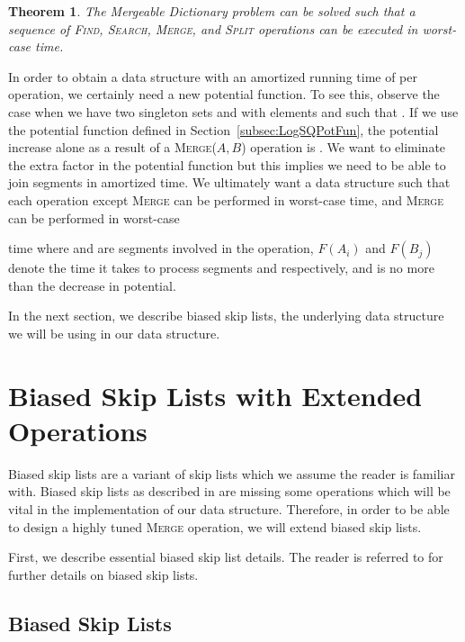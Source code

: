 \documentclass[11pt]{article}
\newcommand{\prob}{Mergeable Dictionary}
\newcommand{\kwMs}{Make-Set}
\newcommand{\kwSpl}{Split}
\newcommand{\kwUnion}{Merge}
\newcommand{\kwSrc}{Search}
\newcommand{\kwFind}{Find}
\newcommand{\Ms}{\mbox{\textsc{\kwMs}}}
\newcommand{\Spl}{\mbox{\textsc{\kwSpl}}}
\newcommand{\Union}{\mbox{\textsc{\kwUnion{}}}}
\newcommand{\Unionx}[2]{\mbox{\textsc{\kwUnion(\ensuremath{#1,#2})}}}
\newcommand{\Src}{\mbox{\textsc{\kwSrc}}}
\newcommand{\Find}{\mbox{\textsc{\kwFind}}}
\newcommand{\segments}{{\segment}s}
\newcommand{\segment}{segment}
\newcommand{\intl}[1]{\ensuremath{#1}}
\newcommand{\intfun}[1]{\ensuremath{F(\intl #1)}}
\newcommand{\hide}[1]{}
\newcounter{count}
\newtheorem{thm}[count]{Theorem}
\begin{document}
\begin{thm} 
\label{thm:logsq} 
The \prob{} problem can be solved such that a sequence of  \hide{\Ms{}, }\Find{}, \Src{}, \Union{}, and \Spl{} operations\hide{,  of which are \Ms{} operations, } can be executed in   worst-case time. 
\end{thm} 



In order to obtain a data structure with an amortized running time of  per operation, we certainly need a new potential function. 
To see this, observe the case when we have two singleton sets  and  with elements  and  such that . If we use the potential function defined in Section~\ref{subsec:LogSQPotFun}, the potential increase alone as a result of a \Unionx{A}{B} operation is . We want to eliminate the extra  factor in the potential function but this implies we need to be able to join \segments{} in amortized  time. We ultimately want a data structure such that each operation except \Union{} can be performed in worst-case  time, and \Union{} can be performed in worst-case 
 
time where  and  are \segments{} involved in the operation, \intfun{A_i} and \intfun{B_j} denote the time it takes to process \segments{}   and  respectively, and  is no more than the decrease in potential. 



In the next section, we describe biased skip lists, the underlying data structure we will be using in our data structure. 


\section{Biased Skip Lists with Extended Operations} 
\label{sec:BSL} 
Biased skip lists are a variant of skip lists \cite{journals/cacm/Pugh90} which we assume the reader is familiar with. Biased skip lists as described in \cite{journals/algorithmica/BagchiBG05} are missing some operations which will be vital in the implementation of our data structure. Therefore, in order to be able to design a highly tuned \Union{} operation, we will extend biased skip lists. 

First, we describe essential biased skip list details. The reader is referred to \cite{journals/algorithmica/BagchiBG05} for further details on biased skip lists. 


\subsection{Biased Skip Lists} 
\label{subsec:BSLBSL} 
\end{document}
